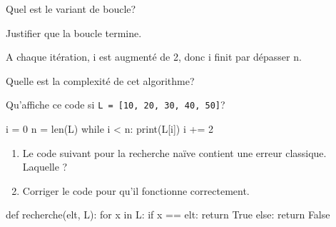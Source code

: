 \documentclass[11pt, a4paper]{report}
\begin{document}
\begin{exercice_cours}{}
    
    \begin{enumerate}
\begin{minipage}{0.75\linewidth}
        \item Quel est le variant de boucle? \hfill{}
        \item Justifier que la boucle termine. \hfill
        
        \begin{blocvisible}[height=1.5]
            A chaque itération, i est augmenté de 2, donc i finit par dépasser n.
        \end{blocvisible}
        \item Quelle est la complexité de cet algorithme? \hfill{}
        \item Qu'affiche ce code si \texttt{L = [10, 20, 30, 40, 50]}? \hfill{}
    
    \end{minipage}\hfill{}
    \begin{minipage}{0.24\linewidth}
        \begin{CodePythontexAlt}[TaillePolice=\large, Largeur=1\linewidth,Centre,Lignes=true,PremLigne=1]{}
    i = 0
    n = len(L)
    while i < n:
        print(L[i])
        i += 2
    \end{CodePythontexAlt}
\end{minipage}

    \end{enumerate} 

       
\end{exercice_cours}



\begin{minipage}{0.48\linewidth}
        \begin{exercice_cours}[Débogage]
            \begin{enumerate}
                \item Le code suivant pour la recherche naïve contient une erreur classique. Laquelle ?
                \item Corriger le code pour qu'il fonctionne correctement.
            \end{enumerate}
    \end{exercice_cours}

    \end{minipage}\hfill
    \begin{minipage}{0.48\linewidth}
\begin{blocvisible}[height=4]
    \begin{CodePythontexAlt}[TaillePolice=\large, Largeur=1\linewidth,Centre,Lignes=true,PremLigne=1]{}
def recherche(elt, L):
    for x in L:
        if x == elt:
            return True
        else:
            return False
    \end{CodePythontexAlt}
\end{blocvisible}
    \end{minipage}
\end{document}
